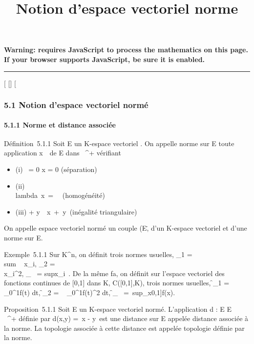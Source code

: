 \documentclass[]{article}
\title{Notion d'espace vectoriel norme}
\author{}
\date{}
\begin{document}
\maketitle

\textbf{Warning: 
requires JavaScript to process the mathematics on this page.\\ If your
browser supports JavaScript, be sure it is enabled.}

\begin{center}\rule{3in}{0.4pt}\end{center}

{[}
{[}{]}
{[}

\subsubsection{5.1 Notion d'espace vectoriel normé}

\paragraph{5.1.1 Norme et distance associée}

Définition~5.1.1 Soit E un K-espace vectoriel . On appelle norme sur E
toute application
x\mapsto~\x\
de E dans ~^+ vérifiant

\begin{itemize}
\itemsep1pt\parskip0pt
\item
  (i) \x\ = 0
  \Leftrightarrow x = 0 (séparation)
\item
  (ii) \\lambda~x\ =
  \lambda~\x\
  (homogénéité)
\item
  (iii) \x + y\
  \leq\ x\
  +\ y\ (inégalité
  triangulaire)
\end{itemize}

On appelle espace vectoriel normé un couple
(E,\.\) d'un K-espace
vectoriel et d'une norme sur E.

Exemple~5.1.1 Sur K^n, on définit trois normes usuelles,
\x_1
= \\sum ~
x_i,
\x_2 =
\sqrt\\\sum
 x_i^2,
\x_\infty~
= supx_i~. De la
même fa\ccon, on définit sur l'espace vectoriel des
fonctions continues de {[}0,1{]} dans K, C({[}0,1{]},K), trois normes
usuelles,
\f_1
=\int ~
_0^1f(t) dt,
\f_2 =
\sqrt\int ~
_0^1f(t)^2 dt,
\f_\infty~
=\
sup_x\in{[}0,1{]}f(x).

Proposition~5.1.1 Soit E un K-espace vectoriel normé. L'application d :
E \times E \rightarrow~ ~^+ définie par d(x,y) =\ x
- y\ est une distance sur E appelée distance
associée à la norme. La topologie associée à cette distance est appelée
topologie définie par la norme.
\end{document}
